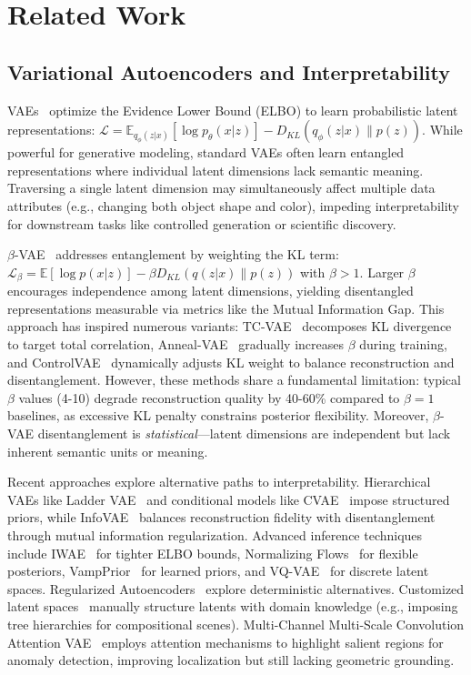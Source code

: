 \documentclass[10pt,twocolumn,letterpaper]{article}
\begin{document}
\section{Related Work}

\subsection{Variational Autoencoders and Interpretability}

VAEs~\cite{kingma2013auto,rezende2014stochastic} optimize the Evidence Lower Bound (ELBO) to learn probabilistic latent representations: $\mathcal{L} = \mathbb{E}_{q_\phi(z|x)}[\log p_\theta(x|z)] - D_{KL}(q_\phi(z|x) \| p(z))$. While powerful for generative modeling, standard VAEs often learn entangled representations where individual latent dimensions lack semantic meaning. Traversing a single latent dimension may simultaneously affect multiple data attributes (e.g., changing both object shape and color), impeding interpretability for downstream tasks like controlled generation or scientific discovery.

$\beta$-VAE~\cite{higgins2017beta} addresses entanglement by weighting the KL term: $\mathcal{L}_{\beta} = \mathbb{E}[\log p(x|z)] - \beta D_{KL}(q(z|x) \| p(z))$ with $\beta > 1$. Larger $\beta$ encourages independence among latent dimensions, yielding disentangled representations measurable via metrics like the Mutual Information Gap. This approach has inspired numerous variants: TC-VAE~\cite{chen2018tc} decomposes KL divergence to target total correlation, Anneal-VAE~\cite{burgess2018understanding} gradually increases $\beta$ during training, and ControlVAE~\cite{shao2020control} dynamically adjusts KL weight to balance reconstruction and disentanglement. However, these methods share a fundamental limitation: typical $\beta$ values (4-10) degrade reconstruction quality by 40-60\% compared to $\beta=1$ baselines, as excessive KL penalty constrains posterior flexibility. Moreover, $\beta$-VAE disentanglement is \textit{statistical}—latent dimensions are independent but lack inherent semantic units or meaning.

Recent approaches explore alternative paths to interpretability. Hierarchical VAEs like Ladder VAE~\cite{sonderby2016ladder} and conditional models like CVAE~\cite{sohn2015cvae} impose structured priors, while InfoVAE~\cite{zhao2019infovae} balances reconstruction fidelity with disentanglement through mutual information regularization. Advanced inference techniques include IWAE~\cite{burda2015iwae} for tighter ELBO bounds, Normalizing Flows~\cite{rezende2015flows} for flexible posteriors, VampPrior~\cite{tomczak2018vamp} for learned priors, and VQ-VAE~\cite{oord2017vqvae} for discrete latent spaces. Regularized Autoencoders~\cite{ghosh2020rae} explore deterministic alternatives. Customized latent spaces~\cite{custom_latent2024} manually structure latents with domain knowledge (e.g., imposing tree hierarchies for compositional scenes). Multi-Channel Multi-Scale Convolution Attention VAE~\cite{mca_vae2024} employs attention mechanisms to highlight salient regions for anomaly detection, improving localization but still lacking geometric grounding.
\end{document}
